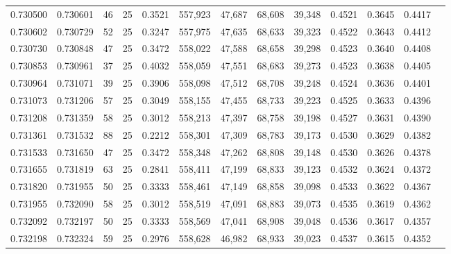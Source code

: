 \begin{tabular}{rrrrrrrrrrrrr}
0.730500 & 0.730601 &    46 &  25 &                                     0.3521 & 557,923 &  47,687 &  68,608 &  39,348 & 0.4521 & 0.3645 & 0.4417 \\
0.730602 & 0.730729 &    52 &  25 &                                     0.3247 & 557,975 &  47,635 &  68,633 &  39,323 & 0.4522 & 0.3643 & 0.4412 \\
0.730730 & 0.730848 &    47 &  25 &                                     0.3472 & 558,022 &  47,588 &  68,658 &  39,298 & 0.4523 & 0.3640 & 0.4408 \\
0.730853 & 0.730961 &    37 &  25 &                                     0.4032 & 558,059 &  47,551 &  68,683 &  39,273 & 0.4523 & 0.3638 & 0.4405 \\
0.730964 & 0.731071 &    39 &  25 &                                     0.3906 & 558,098 &  47,512 &  68,708 &  39,248 & 0.4524 & 0.3636 & 0.4401 \\
0.731073 & 0.731206 &    57 &  25 &                                     0.3049 & 558,155 &  47,455 &  68,733 &  39,223 & 0.4525 & 0.3633 & 0.4396 \\
0.731208 & 0.731359 &    58 &  25 &                                     0.3012 & 558,213 &  47,397 &  68,758 &  39,198 & 0.4527 & 0.3631 & 0.4390 \\
0.731361 & 0.731532 &    88 &  25 &                                     0.2212 & 558,301 &  47,309 &  68,783 &  39,173 & 0.4530 & 0.3629 & 0.4382 \\
0.731533 & 0.731650 &    47 &  25 &                                     0.3472 & 558,348 &  47,262 &  68,808 &  39,148 & 0.4530 & 0.3626 & 0.4378 \\
0.731655 & 0.731819 &    63 &  25 &                                     0.2841 & 558,411 &  47,199 &  68,833 &  39,123 & 0.4532 & 0.3624 & 0.4372 \\
0.731820 & 0.731955 &    50 &  25 &                                     0.3333 & 558,461 &  47,149 &  68,858 &  39,098 & 0.4533 & 0.3622 & 0.4367 \\
0.731955 & 0.732090 &    58 &  25 &                                     0.3012 & 558,519 &  47,091 &  68,883 &  39,073 & 0.4535 & 0.3619 & 0.4362 \\
0.732092 & 0.732197 &    50 &  25 &                                     0.3333 & 558,569 &  47,041 &  68,908 &  39,048 & 0.4536 & 0.3617 & 0.4357 \\
0.732198 & 0.732324 &    59 &  25 &                                     0.2976 & 558,628 &  46,982 &  68,933 &  39,023 & 0.4537 & 0.3615 & 0.4352 \\

\end{tabular}
